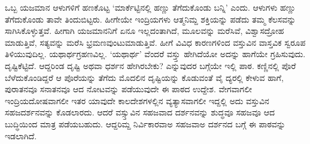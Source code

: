 ಒಬ್ಬ ಯಜಮಾನ ಆಳುಗಳಿಗೆ ಹಣಕೊಟ್ಟ `ಮಾರ್ಕೆಟ್ಟಿನಲ್ಲಿ ಹಣ್ಣು  ತೆಗೆದುಕೊಂಡು ಬನ್ನಿ' ಎಂದು. ಆಳುಗಳು ಹಣ್ಣು ತೆಗೆದುಕೊಂಡು ತಾವೇ ತಿಂದುಬಿಟ್ಟರು. ಹೀಗೇಯೇ ಇಂದ್ರಿಯಗಳು ಆತ್ಮನಿಮ್ದ ಶಕ್ತಿಯನ್ನು ಪಡೆದು ತಮ್ಮ ಕೆಲಸವನ್ನು ಸಾಗಿಸಿಕೊಳ್ಳುತ್ತವೆ. ಹೀಗಾಗಿ ಯಜಮಾನನಿಗೆ ಏನೂ ಇಲ್ಲದಂತಾಗಿದೆ, ಮೂಲವನ್ನು ಮರೆಸಿವೆ, ವಿಶ್ವಾಸದ್ರೋಹ ಮಾಡುತ್ತಿವೆ, ಸತ್ಯವನ್ನು ಮರೆಸಿ ಭ್ರಮಣವುಂಟುಮಾಡುತ್ತಿವೆ. ಹೀಗೆ ವಿವಿಧ ಕಾರಣಗಳಿಂದ ವಸ್ತುವಿನ ವಾಸ್ತವಿಕ ಸ್ವರೂಪ ತಿಳಿಯುವುದಿಲ್ಲ. ಯಥಾರ್ಥಗ್ರಹಣವಿಲ್ಲ. `ಯಥಾರ್ಥ' ವೆಂದರೆ ವಸ್ತ್ತು ಹೇಗಿದೆಯೋ ಅದನ್ನು ಹಾಗೆಯೇ ಗ್ರಹಿಸುವುದು. ದೃಷ್ಟಿಕೆಟ್ಟಿದೆ. ಆದ್ದರಿಂಡ ದೃಷ್ಟಿ ಅಥವಾ ಧರ್ಶನ ಹೇಗಿರಬೇಕು? ಎನ್ನುವುದರ ಬಗ್ಗೆಯೇ ಇಲ್ಲಿ ಪಾಠ. ಕಣ್ಣಿನಲ್ಲಿ ಪೊರೆ ಬೆಳೆದುಕೊಂಡಿದ್ದರೆ ಆ ಪೊರೆಯನ್ನು ತೆಗೆದು ಮೊದಲಿನ ದೃಷ್ಟಿಯನ್ನು ಕೊಡುವಂತೆ  ವೈ ದ್ಯರಲ್ಲಿ ಕೇಳುವ ಹಾಗೆ, ಪುರಾತನವೂ ಸನಾತನವೂ ಆದ ನೋಟವನ್ನು ಪಡೆಯುವುದೇ ಈ ಪಾಠದ ಉದ್ದೇಶ. ವೇಗವಾಗಲೀ ಇಂದ್ರಿಯದೋಷವಾಗಲೀ ಇತರ ಯಾವುದೇ ಕಾಲದೇಶಗಳಲ್ಲಿನ ವ್ಯತ್ಯಾಸವಾಗಲೀ ಇದ್ದಲ್ಲಿ ಅದು ವಸ್ತುವಿನ ಸಹಜದರ್ಶನವನ್ನು ಕೊಡಲಾರದು. ಆದರೆ ವಸ್ಸ್ತುವಿನ ಸಹಜವಾದ ದರ್ಶನವನ್ನು ಶುದ್ಧವೂ ಸಹಜವೂ ಆದ ಬುದ್ಧಿಯಿಂದ ಮಾತ್ರ ಪಡೆಯಬಹುದು. ಆದ್ದರಿಮ್ದ ನಿರ್ವಿಕಾರವಾಅ ಸಹಜವಾಅ ದರ್ಶನದ ಬಗ್ಗೆ ಈ ಪಾಠವನ್ನು ಇಡಲಾಗಿದೆ.
  
\begin{shloka}

\end{shloka}



\section*{}
\section*{}
\section*{}
\section*{}
